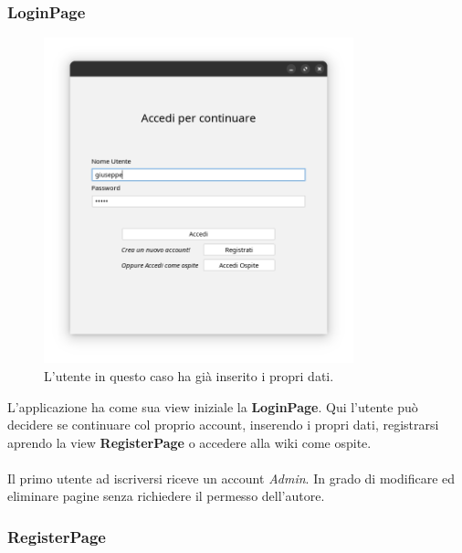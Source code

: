 \documentclass{article}
\begin{document}
	\subsubsection{LoginPage}
	
	\begin{figure}[htbp]
		\centering
		\includegraphics[width=0.8\textwidth,height=0.8\textheight,keepaspectratio]{login_page.png}
		\caption{L'utente in questo caso ha gi\`a inserito i propri dati.}
		\label{fig:1}
	\end{figure}
	
	L'applicazione ha come sua view iniziale la \textbf{LoginPage}. Qui l'utente pu\`o decidere se continuare col proprio account, inserendo i propri dati, registrarsi aprendo la view \textbf{RegisterPage} o accedere alla wiki come ospite.
	\\\\
	Il primo utente ad iscriversi riceve un account {\itshape{Admin}}. In grado di modificare ed eliminare pagine senza richiedere il permesso dell'autore.
	
	\newpage
	
	\subsubsection{RegisterPage}
	
\end{document}
